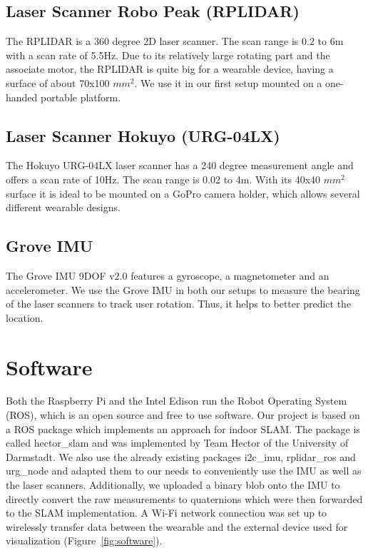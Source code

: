 \documentclass{sigchi-ext}
\begin{document}
\subsection{Laser Scanner Robo Peak (RPLIDAR)}
The RPLIDAR is a 360 degree 2D laser scanner. The scan range is 0.2 to 6m with a scan rate of 5.5Hz. Due to its relatively large rotating part and the associate motor, the RPLIDAR is quite big for a wearable device, having a surface of about 70x100 $mm^2$. We use it in our first setup mounted on a one-handed portable platform.

\subsection{Laser Scanner Hokuyo (URG-04LX)}
The Hokuyo URG-04LX laser scanner has a 240 degree measurement angle and offers a scan rate of 10Hz. The scan range is 0.02 to 4m. With its 40x40 $mm^2$ surface it is ideal to be mounted on a GoPro camera holder, which allows several different wearable designs.

\subsection{Grove IMU}
The Grove IMU 9DOF v2.0 features a gyroscope, a magnetometer and an accelerometer. We use the Grove IMU in both our setups to measure the bearing of the laser scanners to track user rotation. Thus, it helps to better predict the location.

\section{Software}
Both the Raspberry Pi and the Intel Edison run the Robot Operating System (ROS), which is an open source and free to use software. Our project is based on a ROS package which implements an approach for indoor SLAM. The package is called hector\_slam\cite{hector} and was implemented by Team Hector of the University of Darmstadt. We also use the already existing packages i2c\_imu\cite{i2c}, rplidar\_ros\cite{rplidar} and urg\_node\cite{urg} and adapted them to our needs to conveniently use the IMU as well as the laser scanners. Additionally, we uploaded a binary blob\cite{blob} onto the IMU to directly convert the raw measurements to quaternions which were then forwarded to the SLAM implementation. A Wi-Fi network connection was set up to wirelessly transfer data between the wearable and the external device used for visualization (Figure~\ref{fig:software}).
\end{document}
